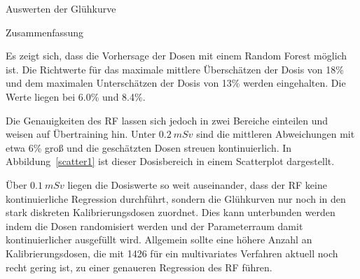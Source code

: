 \documentclass[20pt]{beamer}
\begin{document}
\begin{columns}[t, onlytextwidth]
\begin{column}{0.666\textwidth}
\begin{block}{Auswerten der Glühkurve}
\begin{multicols}{2}
\begin{figure}
              \label{attrdiff}
          \end{figure}
              \end{multicols}
      \end{block}%
      \begin{block}{Zusammenfassung}%
          \begin{multicols}{2}
                  \begin{large}
          Es zeigt sich, dass die Vorhersage der Dosen mit einem Random Forest möglich ist.
          Die Richtwerte für das maximale mittlere Überschätzen der Dosis von 18\% und dem maximalen Unterschätzen der Dosis von 13\% werden eingehalten.
          Die Werte liegen bei 6.0\% und 8.4\%.
                  \end{large}

                  \begin{large}
                  Die Genauigkeiten des RF lassen sich jedoch in zwei Bereiche einteilen und weisen auf Übertraining hin.
                      Unter $\SI{0.2}{mSv}$ sind die mittleren Abweichungen mit etwa 6\% groß und die geschätzten Dosen streuen kontinuierlich. In Abbildung~\ref{scatter1} ist dieser Dosisbereich in einem Scatterplot dargestellt. 
                  \end{large}

                  \begin{large}
                      Über $\SI{0.1}{mSv}$ liegen die Dosiswerte so weit auseinander, dass der RF keine kontinuierliche Regression durchführt, sondern die Glühkurven nur noch in den stark diskreten Kalibrierungsdosen zuordnet. Dies kann unterbunden werden indem die Dosen randomisiert werden und der Parameterraum damit kontinuierlicher ausgefüllt wird. Allgemein sollte eine höhere Anzahl an Kalibrierungsdosen, die mit 1426 für ein multivariates Verfahren aktuell noch recht gering ist, zu einer genaueren Regression des RF führen.
                  \end{large}

                  \begin{large}
                  \end{large}
                      

\end{multicols}
\end{block}
\end{column}
\end{columns}
\end{document}
